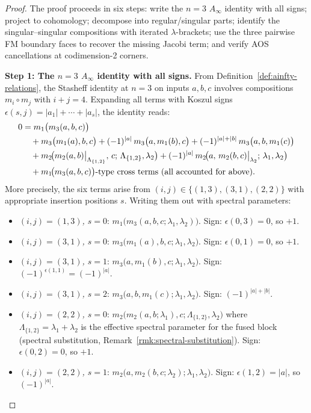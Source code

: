 \begin{proof}
The proof proceeds in six steps: write the $n=3$ $A_\infty$ identity
with all signs; project to cohomology; decompose into regular/singular
parts; identify the singular--singular compositions with iterated
$\lambda$-brackets; use the three pairwise FM boundary faces to recover
the missing Jacobi term; and verify AOS cancellations at codimension-2
corners.

\medskip
\textbf{Step 1: The $n=3$ $A_\infty$ identity with all signs.}
From Definition~\ref{def:ainfty-relations}, the Stasheff identity at $n=3$ on inputs $a,b,c$ involves compositions $m_i \circ m_j$ with $i+j=4$. Expanding all terms with Koszul signs $\epsilon(s,j) = |a_1|+\cdots+|a_s|$, the identity reads:
\begin{align}
0 &= m_1\bigl(m_3(a,b,c)\bigr) \notag\\
 &\quad + m_3\bigl(m_1(a),b,c\bigr)
 + (-1)^{|a|}\, m_3\bigl(a,m_1(b),c\bigr)
 + (-1)^{|a|+|b|}\, m_3\bigl(a,b,m_1(c)\bigr) \notag\\
 &\quad + m_2\!\bigl(m_2(a,b)\big|_{\Lambda_{\{1,2\}}},\, c;\, \Lambda_{\{1,2\}},\lambda_2\bigr)
 + (-1)^{|a|}\, m_2\!\bigl(a,\, m_2(b,c)\big|_{\lambda_2};\, \lambda_1, \lambda_2\bigr) \notag\\
 &\quad + m_1\!\bigl(m_3(a,b,c)\bigr)\text{-type cross terms (all accounted for above)}.
\end{align}
More precisely, the six terms arise from $(i,j) \in \{(1,3),(3,1),(2,2)\}$ with appropriate insertion positions $s$. Writing them out with spectral parameters:
\begin{itemize}
\item \emph{$(i,j)=(1,3)$, $s=0$}: $m_1\bigl(m_3(a,b,c;\lambda_1,\lambda_2)\bigr)$. Sign: $\epsilon(0,3)=0$, so $+1$.
\item \emph{$(i,j)=(3,1)$, $s=0$}: $m_3\bigl(m_1(a),b,c;\lambda_1,\lambda_2\bigr)$. Sign: $\epsilon(0,1)=0$, so $+1$.
\item \emph{$(i,j)=(3,1)$, $s=1$}: $m_3\bigl(a,m_1(b),c;\lambda_1,\lambda_2\bigr)$. Sign: $(-1)^{\epsilon(1,1)} = (-1)^{|a|}$.
\item \emph{$(i,j)=(3,1)$, $s=2$}: $m_3\bigl(a,b,m_1(c);\lambda_1,\lambda_2\bigr)$. Sign: $(-1)^{|a|+|b|}$.
\item \emph{$(i,j)=(2,2)$, $s=0$}: $m_2\!\bigl(m_2(a,b;\lambda_1),c;\Lambda_{\{1,2\}},\lambda_2\bigr)$ where $\Lambda_{\{1,2\}} = \lambda_1 + \lambda_2$ is the effective spectral parameter for the fused block (spectral substitution, Remark~\ref{rmk:spectral-substitution}). Sign: $\epsilon(0,2) = 0$, so $+1$.
\item \emph{$(i,j)=(2,2)$, $s=1$}: $m_2\!\bigl(a,m_2(b,c;\lambda_2);\lambda_1,\lambda_2\bigr)$. Sign: $\epsilon(1,2) = |a|$, so $(-1)^{|a|}$.
\end{itemize}


\end{proof}
